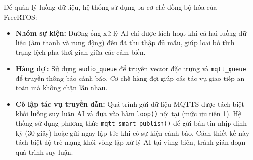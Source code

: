 Để quản lý luồng dữ liệu, hệ thống sử dụng ba cơ chế đồng bộ hóa của FreeRTOS:

\begin{itemize}
    \item \textbf{Nhóm sự kiện:} Đường ống xử lý AI chỉ được kích hoạt khi cả hai luồng dữ liệu (âm thanh và rung động) đều đã thu thập đủ mẫu, giúp loại bỏ tình trạng lệch pha thời gian giữa các cảm biến.
    \item \textbf{Hàng đợi:} Sử dụng \texttt{audio\_queue} để truyền vector đặc trưng và \texttt{mqtt\_queue} để truyền thông báo cảnh báo. Cơ chế hàng đợi giúp các tác vụ giao tiếp an toàn mà không chặn lẫn nhau.
    \item \textbf{Cô lập tác vụ truyền dẫn:} Quá trình gửi dữ liệu MQTTS được tách biệt khỏi luồng suy luận AI và đưa vào hàm \texttt{loop()} nội tại (mức ưu tiên 1). Hệ thống sử dụng phương thức \texttt{mqtt\_smart\_publish()} để gửi bản tin nhịp định kỳ (30 giây) hoặc gửi ngay lập tức khi có sự kiện cảnh báo. Cách thiết kế này tách biệt độ trễ mạng khỏi vòng lặp xử lý AI tại vùng biên, tránh gián đoạn quá trình suy luận.
\end{itemize}

